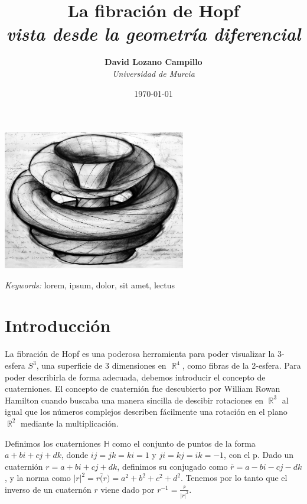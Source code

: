 \documentclass[11pt]{diazessay} %
\title{\textbf{La fibración de Hopf} \\ {\Large\itshape vista desde la geometría diferencial}} %
\author{\textbf{David Lozano Campillo} \\ \textit{Universidad de Murcia}} %
\date{\today} %
\DeclareMathOperator{\R}{\mathbb{R}}
\begin{document}
\maketitle %

\begin{center}\includegraphics[width=8cm]{Figures/tsai.jpeg}\end{center}
\vspace{1cm}

\begin{abstract}

\end{abstract}

\hspace*{3.6mm}\textit{Keywords:} lorem, ipsum, dolor, sit amet, lectus %

\vspace{30pt}


\section*{Introducción}

La fibración de Hopf es una poderosa herramienta para poder visualizar la 3-esfera $S^3$, una superficie de 3 dimensiones en $\R^4$, como fibras de la 2-esfera. Para poder describirla de forma adecuada, debemos introducir el concepto de cuaterniones. El concepto de cuaternión fue descubierto por William Rowan Hamilton cuando buscaba una manera sincilla de descibir rotaciones en $\R^3$ al igual que los números complejos describen fácilmente una rotación en el plano $\R^2$ mediante la multiplicación.

Definimos los cuaterniones $\mathbb{H}$ como el conjunto de puntos de la forma $a+bi+cj+dk$, donde $ij=jk=ki=1$ y $ji=kj=ik=-1$, con el p. Dado un cuaternión $r=a+bi+cj+dk$, definimos su conjugado como $\overline{r}=a-bi-cj-dk$, y la norma como $|r|^2 = r\overline(r) = a^2+b^2+c^2+d^2$. Tenemos por lo tanto que el inverso de un cuaternón $r$ viene dado por $r^{-1}=\frac{\overline{r}}{|r|^2}$.
\end{document}
